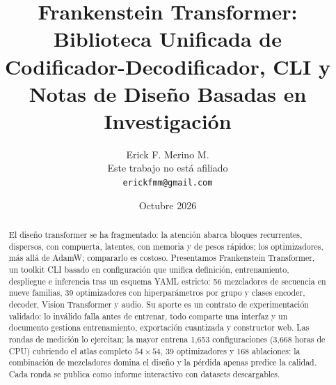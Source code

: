 \documentclass[11pt,a4paper]{article}
\title{Frankenstein Transformer:\\Biblioteca Unificada de Codificador-Decodificador, CLI y Notas de Diseño Basadas en Investigación}
\author{
Erick F. Merino M. \\
Este trabajo no está afiliado \\
\texttt{erickfmm@gmail.com}
}
\date{Octubre 2026}
\renewcommand{\_}{\fsunderscore\allowbreak}
\begin{document}
\maketitle

\begin{abstract}
El diseño transformer se ha fragmentado: la atención abarca bloques recurrentes, dispersos, con compuerta, latentes, con memoria y de pesos rápidos; los optimizadores, más allá de AdamW; compararlo es costoso. Presentamos Frankenstein Transformer, un toolkit CLI basado en configuración que unifica definición, entrenamiento, despliegue e inferencia tras un esquema YAML estricto: 56 mezcladores de secuencia en nueve familias, 39 optimizadores con hiperparámetros por grupo y clases encoder, decoder, Vision Transformer y audio. Su aporte es un contrato de experimentación validado: lo inválido falla antes de entrenar, todo comparte una interfaz y un documento gestiona entrenamiento, exportación cuantizada y constructor web. Las rondas de medición lo ejercitan; la mayor entrena 1{,}653 configuraciones (3{,}668 horas de CPU) cubriendo el atlas completo $54\times54$, 39 optimizadores y 168 ablaciones: la combinación de mezcladores domina el diseño y la pérdida apenas predice la calidad. Cada ronda se publica como informe interactivo con datasets descargables.
\end{abstract}

\tableofcontents
\newpage
















\appendix
\renewcommand{\thesection}{\arabic{section}}
\setcounter{section}{0}
\end{document}
